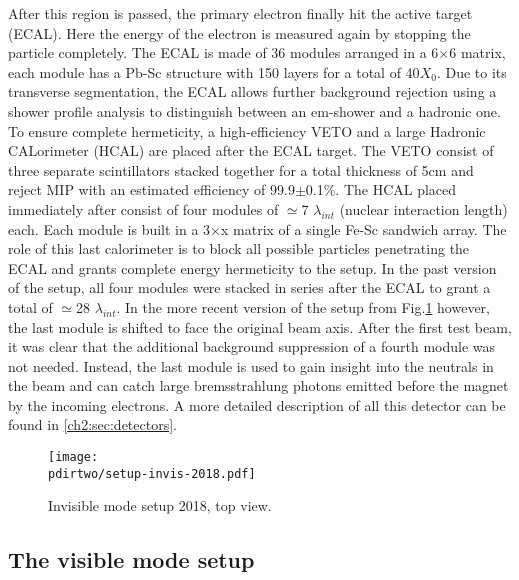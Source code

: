After this region is passed, the primary electron finally hit the active target (ECAL). Here the energy of the electron is measured again by stopping the particle completely. The ECAL is made of 36 modules arranged in a 6$\times$6 matrix, each module has a Pb-Sc structure with 150 layers for a total of 40$X_0$. Due to its transverse segmentation, the ECAL allows further background rejection using a shower profile analysis to distinguish between an em-shower and a hadronic one. To ensure complete hermeticity, a high-efficiency VETO and a large Hadronic CALorimeter (HCAL) are placed after the ECAL target. The VETO consist of three separate scintillators stacked together for a total thickness of 5\si{cm} and reject MIP with an estimated efficiency of 99.9$\pm$0.1\%. The HCAL placed immediately after consist of four modules of $\simeq$7 $\lambda_{int}$ (nuclear interaction length) each. Each module is built in a 3$\times$x matrix of a single Fe-Sc sandwich array. The role of this last calorimeter is to block all possible particles penetrating the ECAL and grants complete energy hermeticity to the setup. In the past version of the setup, all four modules were stacked in series after the ECAL to grant a total of $\simeq$28 $\lambda_{int}$. In the more recent version of the setup from Fig.\ref{fig:setup-invis-2018} however, the last module is shifted to face the original beam axis. After the first test beam, it was clear that the additional background suppression of a fourth module was not needed. Instead, the last module is used to gain insight into the neutrals in the beam and can catch large bremsstrahlung photons emitted before the magnet by the incoming electrons. A more detailed description of all this detector can be found in \ref{ch2:sec:detectors}.


\begin{figure}[tbh!]
\centering
\texttt{[image: \\pdirtwo/setup-invis-2018.pdf]}
\caption[invisible mode setup 2018]{Invisible mode setup 2018, top view.}
\label{fig:setup-invis-2018}
\end{figure}

\subsection{The visible mode setup}
\label{ch2:sec:vismode}

